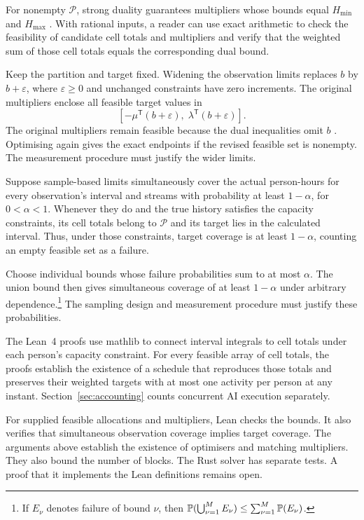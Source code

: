 For nonempty $\mathcal P$, strong duality guarantees multipliers whose bounds equal $H_{\min}$ and $H_{\max}$ \cite[Sections~5.2--5.3]{boydvandenberghe2004}. With rational inputs, a reader can use exact arithmetic to check the feasibility of candidate cell totals and multipliers and verify that the weighted sum of those cell totals equals the corresponding dual bound.

Keep the partition and target fixed. Widening the observation limits replaces $b$ by $b+\varepsilon$, where $\varepsilon\geq0$ and unchanged constraints have zero increments. The original multipliers enclose all feasible target values in
\begin{equation}
\label{eq:relaxed-certificates}
 [-\mu^\mathsf{T}(b+\varepsilon),\;\lambda^\mathsf{T}(b+\varepsilon)].
\end{equation}
The original multipliers remain feasible because the dual inequalities omit $b$ \cite[Section~5.6]{boydvandenberghe2004}. Optimising again gives the exact endpoints if the revised feasible set is nonempty. The measurement procedure must justify the wider limits.

Suppose sample-based limits simultaneously cover the actual person-hours for every observation's interval and streams with probability at least $1-\alpha$, for $0<\alpha<1$. Whenever they do and the true history satisfies the capacity constraints, its cell totals belong to $\mathcal P$ and its target lies in the calculated interval. Thus, under those constraints, target coverage is at least $1-\alpha$, counting an empty feasible set as a failure.

Choose individual bounds whose failure probabilities sum to at most $\alpha$. The union bound then gives simultaneous coverage of at least $1-\alpha$ under arbitrary dependence.\footnote{If $E_\nu$ denotes failure of bound $\nu$, then $\mathbb P(\bigcup_{\nu=1}^M E_\nu)\leq\sum_{\nu=1}^M\mathbb P(E_\nu)$.} The sampling design and measurement procedure must justify these probabilities.

The Lean~4 proofs use mathlib \cite{demouraullrich2021,mathlib2020} to connect interval integrals to cell totals under each person's capacity constraint. For every feasible array of cell totals, the proofs establish the existence of a schedule that reproduces those totals and preserves their weighted targets with at most one activity per person at any instant. Section~\ref{sec:accounting} counts concurrent AI execution separately.

For supplied feasible allocations and multipliers, Lean checks the bounds. It also verifies that simultaneous observation coverage implies target coverage. The arguments above establish the existence of optimisers and matching multipliers. They also bound the number of blocks. The Rust solver has separate tests. A proof that it implements the Lean definitions remains open.

